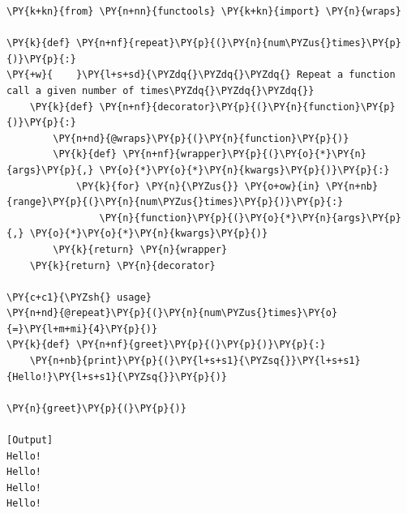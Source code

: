 \begin{Verbatim}[label=\makebox{\url{https://github.com/lucabaldini/cmepda/tree/master/slides/latex/snippets/decorator\_repeat.py}},commandchars=\\\{\}]
\PY{k+kn}{from} \PY{n+nn}{functools} \PY{k+kn}{import} \PY{n}{wraps}

\PY{k}{def} \PY{n+nf}{repeat}\PY{p}{(}\PY{n}{num\PYZus{}times}\PY{p}{)}\PY{p}{:}
\PY{+w}{    }\PY{l+s+sd}{\PYZdq{}\PYZdq{}\PYZdq{} Repeat a function call a given number of times\PYZdq{}\PYZdq{}\PYZdq{}}
    \PY{k}{def} \PY{n+nf}{decorator}\PY{p}{(}\PY{n}{function}\PY{p}{)}\PY{p}{:}
        \PY{n+nd}{@wraps}\PY{p}{(}\PY{n}{function}\PY{p}{)}
        \PY{k}{def} \PY{n+nf}{wrapper}\PY{p}{(}\PY{o}{*}\PY{n}{args}\PY{p}{,} \PY{o}{*}\PY{o}{*}\PY{n}{kwargs}\PY{p}{)}\PY{p}{:}
            \PY{k}{for} \PY{n}{\PYZus{}} \PY{o+ow}{in} \PY{n+nb}{range}\PY{p}{(}\PY{n}{num\PYZus{}times}\PY{p}{)}\PY{p}{:}
                \PY{n}{function}\PY{p}{(}\PY{o}{*}\PY{n}{args}\PY{p}{,} \PY{o}{*}\PY{o}{*}\PY{n}{kwargs}\PY{p}{)}
        \PY{k}{return} \PY{n}{wrapper}
    \PY{k}{return} \PY{n}{decorator}

\PY{c+c1}{\PYZsh{} usage}
\PY{n+nd}{@repeat}\PY{p}{(}\PY{n}{num\PYZus{}times}\PY{o}{=}\PY{l+m+mi}{4}\PY{p}{)}
\PY{k}{def} \PY{n+nf}{greet}\PY{p}{(}\PY{p}{)}\PY{p}{:}
    \PY{n+nb}{print}\PY{p}{(}\PY{l+s+s1}{\PYZsq{}}\PY{l+s+s1}{Hello!}\PY{l+s+s1}{\PYZsq{}}\PY{p}{)}

\PY{n}{greet}\PY{p}{(}\PY{p}{)}

[Output]
Hello!
Hello!
Hello!
Hello!
\end{Verbatim}